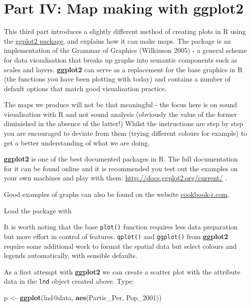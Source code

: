 \documentclass[]{article}
\newenvironment{Shaded}{}{}
\newcommand{\KeywordTok}[1]{\textcolor[rgb]{0.00,0.44,0.13}{\textbf{{#1}}}}
\newcommand{\StringTok}[1]{\textcolor[rgb]{0.25,0.44,0.63}{{#1}}}
\newcommand{\NormalTok}[1]{{#1}}
\begin{document}
\clearpage

\section{Part IV: Map making with
ggplot2}\label{part-iv-map-making-with-ggplot2}

This third part introduces a slightly different method of creating plots
in R using the \href{http://ggplot2.org/}{ggplot2 package}, and explains
how it can make maps. The package is an implementation of the Grammar of
Graphics (Wilkinson 2005) - a general scheme for data visualisation that
breaks up graphs into semantic components such as scales and layers.
\textbf{ggplot2} can serve as a replacement for the base graphics in R
(the functions you have been plotting with today) and contains a number
of default options that match good visualisation practice.

The maps we produce will not be that meaningful - the focus here is on
sound visualisation with R and not sound analysis (obviously the value
of the former diminished in the absence of the latter!) Whilst the
instructions are step by step you are encouraged to deviate from them
(trying different colours for example) to get a better understanding of
what we are doing.

\textbf{ggplot2} is one of the best documented packages in R. The full
documentation for it can be found online and it is recommended you test
out the examples on your own machines and play with them:
\url{http://docs.ggplot2.org/current/} .

Good examples of graphs can also be found on the website
\href{http://www.cookbook-r.com/Graphs/}{cookbook-r.com}.

Load the package with

It is worth noting that the base \texttt{plot()} function requires less
data preparation but more effort in control of features.
\texttt{qplot()} and \texttt{ggplot()} from \textbf{ggplot2} require
some additional work to format the spatial data but select colours and
legends automatically, with sensible defaults.

As a first attempt with \textbf{ggplot2} we can create a scatter plot
with the attribute data in the \texttt{lnd} object created above. Type:

\begin{Shaded}
\begin{Highlighting}[]
\NormalTok{p <-}\StringTok{ }\KeywordTok{ggplot}\NormalTok{(lnd@data, }\KeywordTok{aes}\NormalTok{(Partic_Per, Pop_2001))}
\end{Highlighting}
\end{Shaded}
\end{document}
